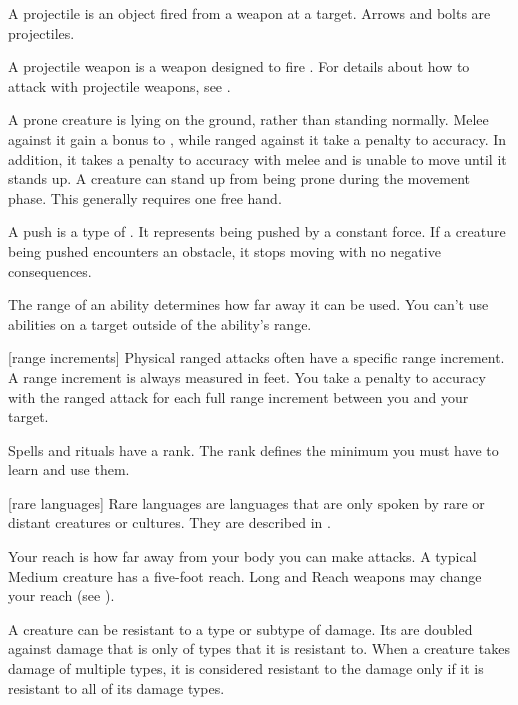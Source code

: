  A projectile is an object fired from a weapon at a target.
Arrows and bolts are projectiles.

 A projectile weapon is a weapon designed to fire .
For details about how to attack with projectile weapons, see .

 A prone creature is lying on the ground, rather than standing normally.
Melee  against it gain a  bonus to , while ranged  against it take a  penalty to accuracy.
In addition, it takes a  penalty to accuracy with melee  and is unable to move until it stands up.
A creature can stand up from being prone during the movement phase.
This generally requires one free hand.

 A push is a type of .
It represents being pushed by a constant force.
If a creature being pushed encounters an obstacle, it stops moving with no negative consequences.

 The range of an ability determines how far away it can be used.
You can't use abilities on a target outside of the ability's range.

[range increments] Physical ranged attacks often have a specific range increment.
A range increment is always measured in feet.
You take a  penalty to accuracy with the ranged attack for each full range increment between you and your target.

 Spells and rituals have a rank.
The rank defines the minimum  you must have to learn and use them.

[rare languages] Rare languages are languages that are only spoken by rare or distant creatures or cultures.
They are described in .

 Your reach is how far away from your body you can make  attacks.
A typical Medium creature has a five-foot reach.
Long and Reach weapons may change your reach (see ).

 A creature can be resistant to a type or subtype of damage.
Its  are doubled against damage that is only of types that it is resistant to.
When a creature takes damage of multiple types, it is considered resistant to the damage only if it is resistant to all of its damage types.

